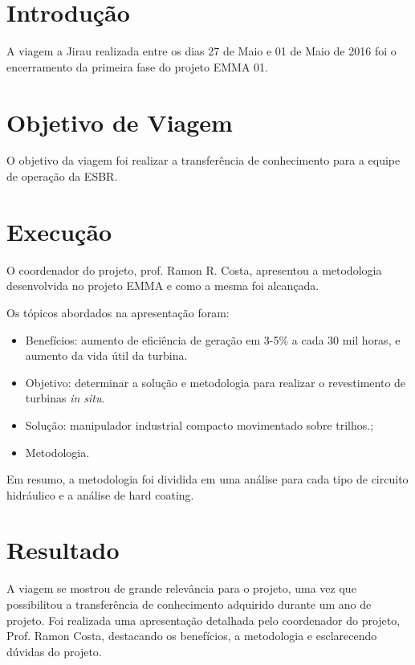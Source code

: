 \documentclass[a4paper,11pt,oneside,openany,brazilian,version=last,draft=false,]{main}
\begin{document}

\begin{twocolumn}

\section{Introdução}
A viagem a Jirau realizada entre os dias 27 de Maio e 01 de Maio de 2016 foi o
encerramento da primeira fase do projeto EMMA 01. 

\section{Objetivo de Viagem}
O objetivo da viagem foi
realizar a transferência de conhecimento para a equipe de operação da ESBR.


\section{Execução}
O coordenador do projeto, prof. Ramon R. Costa, apresentou a metodologia
desenvolvida no projeto EMMA e como a mesma foi alcançada.

Os tópicos abordados na apresentação foram:
\begin{itemize}
  \item Benefícios: aumento de eficiência de geração em 3-5\% a cada 30 mil
  horas, e aumento da vida útil da turbina.
  \item Objetivo: determinar a solução e metodologia para realizar o
revestimento de turbinas \textit{in situ}.
  \item Solução: manipulador industrial compacto movimentado sobre trilhos.;
  \item Metodologia.
\end{itemize}

Em resumo, a metodologia foi dividida em uma análise para cada tipo de circuito
hidráulico e a análise de hard coating.

\section{Resultado}
A viagem se mostrou de grande relevância para o projeto,
uma vez que possibilitou a transferência de conhecimento adquirido durante um
ano de projeto. Foi realizada uma apresentação detalhada pelo coordenador do
projeto, Prof. Ramon Costa, destacando os benefícios, a metodologia e
esclarecendo dúvidas do projeto.
\end{twocolumn}
\end{document}
